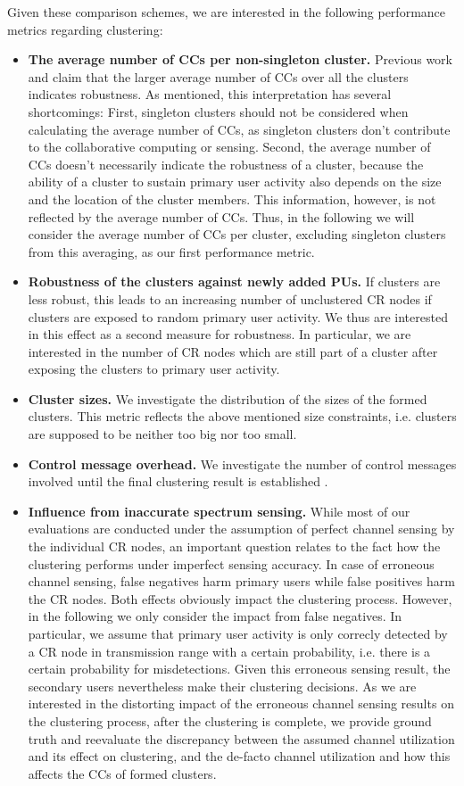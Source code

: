 \documentclass[times]{ettauth}
\theoremstyle{mytheoremstyle}
\theoremstyle{mytheoremstyle}
\theoremstyle{mytheoremstyle}
\begin{document}
Given these comparison schemes, we are interested in the following performance metrics regarding clustering:
\begin{itemize}
\item \textbf{The average number of CCs per non-singleton cluster.}
Previous work \cite{LIU_TMC11_2} and \cite{Li11_ROSS} claim that the larger average number of CCs over all the clusters indicates robustness. As mentioned, this interpretation has several shortcomings:
First, singleton clusters should not be considered when calculating the average number of CCs, as singleton clusters don't contribute to the collaborative computing or sensing.
Second, the average number of CCs doesn't necessarily indicate the robustness of a cluster, because the ability of a cluster to sustain primary user activity also depends on the size and the location of the cluster members. This information, however, is not reflected by the average number of CCs.
Thus, in the following we will consider the average number of CCs per cluster, excluding singleton clusters from this averaging, as our first performance metric.
\item \textbf{Robustness of the clusters against newly added PUs.}
If clusters are less robust, this leads to an increasing number of unclustered CR nodes if clusters are exposed to random primary user activity.
We thus are interested in this effect as a second measure for robustness. 
In particular, we are interested in the number of CR nodes which are still part of a cluster after exposing the clusters to primary user activity.
\item \textbf{Cluster sizes.}
We investigate the distribution of the sizes of the formed clusters.
This metric reflects the above mentioned size constraints, i.e. clusters are supposed to be neither too big nor too small.
\item \textbf{Control message overhead.}
We investigate the number of control messages involved until the final clustering result is established .
\item \textbf{Influence from inaccurate spectrum sensing.}
While most of our evaluations are conducted under the assumption of perfect channel sensing by the individual CR nodes, an important question relates to the fact how the clustering performs under imperfect sensing accuracy.
In case of erroneous channel sensing, false negatives harm primary users while false positives harm the CR nodes.
Both effects obviously impact the clustering process. 
However, in the following we only consider the impact from false negatives. 
In particular, we assume that primary user activity is only correcly detected by a CR node in transmission range with a certain probability, i.e. there is a certain probability for misdetections.
Given this erroneous sensing result, the secondary users nevertheless make their clustering decisions.
As we are interested in the distorting impact of the erroneous channel sensing results on the clustering process, after the clustering is complete, we provide ground truth and reevaluate the discrepancy between the assumed channel utilization and its effect on clustering, and the de-facto channel utilization and how this affects the CCs of formed clusters.
\end{itemize}
\end{document}
